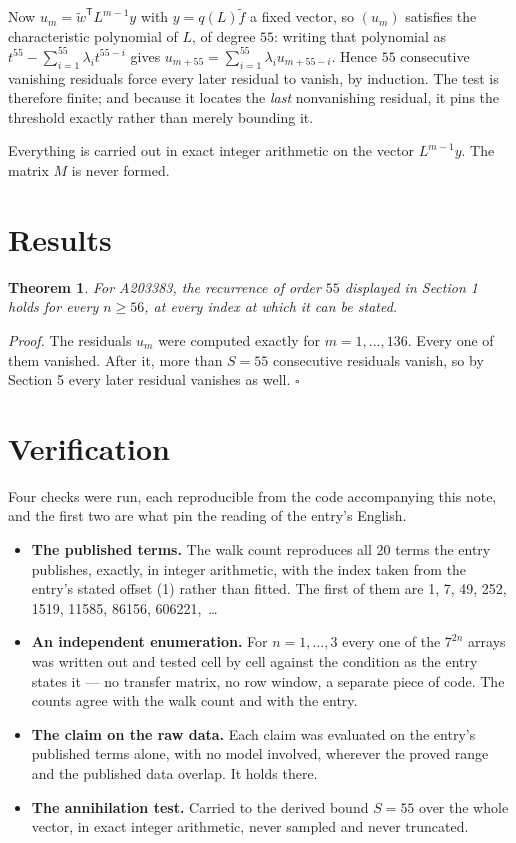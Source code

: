 \documentclass[11pt]{article}
\newtheorem{theorem}{Theorem}
\theoremstyle{definition}
\begin{document}
Now $u_m = \tilde w^{\mathsf T} L^{m-1} y$ with $y = q(L)\tilde f$ a fixed vector, so $(u_m)$ satisfies the characteristic polynomial of $L$, of degree $55$: writing that polynomial as $t^{55} - \sum_{i=1}^{55} \lambda_i t^{55-i}$ gives $u_{m+55} = \sum_{i=1}^{55} \lambda_i u_{m+55-i}$. Hence $55$ consecutive vanishing residuals force every later residual to vanish, by induction. The test is therefore finite; and because it locates the {\itshape last} nonvanishing residual, it pins the threshold exactly rather than merely bounding it.

Everything is carried out in exact integer arithmetic on the vector $L^{m-1}y$. The matrix $M$ is never formed.

\section{Results}

\begin{theorem} For A203383, the recurrence of order $55$ displayed in Section 1 holds for every $n \ge 56$, at every index at which it can be stated.\end{theorem}

{\itshape Proof.} The residuals $u_m$ were computed exactly for $m = 1,\dots,136$. Every one of them vanished. After it, more than $S = 55$ consecutive residuals vanish, so by Section 5 every later residual vanishes as well. $\square$

\section{Verification}

Four checks were run, each reproducible from the code accompanying this note, and the first two are what pin the reading of the entry's English.

\begin{itemize}

\item {\bfseries The published terms.} The walk count reproduces all 20 terms the entry publishes, exactly, in integer arithmetic, with the index taken from the entry's stated offset (1) rather than fitted. The first of them are 1, 7, 49, 252, 1519, 11585, 86156, 606221,~\dots

\item {\bfseries An independent enumeration.} For $n = 1,\dots,3$ every one of the $7^{2n}$ arrays was written out and tested cell by cell against the condition as the entry states it --- no transfer matrix, no row window, a separate piece of code. The counts agree with the walk count and with the entry.

\item {\bfseries The claim on the raw data.} Each claim was evaluated on the entry's published terms alone, with no model involved, wherever the proved range and the published data overlap. It holds there.

\item {\bfseries The annihilation test.} Carried to the derived bound $S = 55$ over the whole vector, in exact integer arithmetic, never sampled and never truncated.

\end{itemize}
\end{document}
